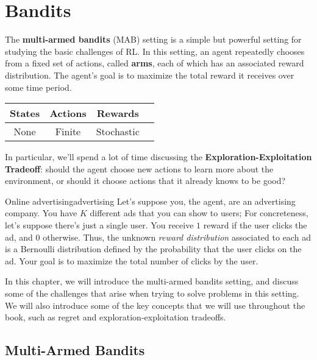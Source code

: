 \documentclass[../main/main]{subfiles}
\begin{document}
\tableofcontents
    
\chapter{Bandits}


The \textbf{multi-armed bandits} (MAB) setting is a simple but powerful setting for studying the basic challenges of RL. In this setting, an agent repeatedly chooses from a fixed set of actions, called \textbf{arms}, each of which has an associated reward distribution. The agent's goal is to maximize the total reward it receives over some time period.

\begin{center}
    \begin{tabular}{|c|c|c|c|}
        \hline
        \textbf{States} & \textbf{Actions} &\textbf{Rewards} \\
        \hline
        None & Finite & Stochastic \\
        \hline
    \end{tabular}
\end{center}

In particular, we'll spend a lot of time discussing the \textbf{Exploration-Exploitation Tradeoff}: should the agent choose new actions to learn more about the environment, or should it choose actions that it already knows to be good?

\begin{example}{Online advertising}{advertising}
    Let's suppose you, the agent, are an advertising company. You have $K$ different ads that you can show to users; For concreteness, let's suppose there's just a single user. You receive $1$ reward if the user clicks the ad, and $0$ otherwise. Thus, the unknown \emph{reward distribution} associated to each ad is a Bernoulli distribution defined by the probability that the user clicks on the ad. Your goal is to maximize the total number of clicks by the user.
\end{example}


In this chapter, we will introduce the multi-armed bandits setting, and discuss some of the challenges that arise when trying to solve problems in this setting. We will also introduce some of the key concepts that we will use throughout the book, such as regret and exploration-exploitation tradeoffs.

\section{Multi-Armed Bandits}
\end{document}
